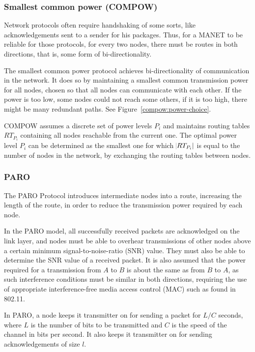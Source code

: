 \subsubsection{Smallest common power (COMPOW)}
Network protocols often require handshaking of some sorts, like acknowledgements
sent to a sender for his packages. Thus, for a MANET to be reliable for those
protocols, for every two nodes, there must be routes in both directions, that
is, some form of bi-directionality.

The smallest common power protocol\cite{narayanaswamy2002power} achieves bi-directionality
of communication in the network.
It does so by maintaining a smallest common transmission power for all nodes,
chosen so that all nodes can communicate with each other. If the power is too
low, some nodes could not reach some others, if it is too high, there might be
many redundant paths. See Figure~\ref{compow:power-choice}.

COMPOW assumes a discrete set of power levels $P_{i}$ and maintains routing
tables ${RT}_{P_{i}}$ containing all nodes reachable from the current one. The
optimal power level $P_{i}$ can be determined as the smallest one for which
$\abs{RT_{P_{i}}}$ is equal to the number of nodes in the network, by
exchanging the routing tables between nodes.


\subsubsection{PARO}
The PARO Protocol\cite{gomez2003paro} introduces intermediate nodes into a
route, increasing the length of the route, in order to reduce the transmission
power required by each node.

In the PARO model, all successfully received packets are acknowledged on the
link layer, and nodes must be able to overhear transmissions of other nodes
above a certain minimum signal-to-noise-ratio (SNR) value. They must also
be able to determine the SNR value of a received packet. It is also assumed
that the power required for a transmission from $A$ to $B$ is about the same
as from $B$ to $A$, as such interference conditions must be similar in both
directions, requiring the use of appropriate interference-free media access
control (MAC) such as found in 802.11.

In PARO, a node keeps it transmitter on for sending a packet for $L/C$ seconds,
where $L$ is the number of bits to be transmitted and $C$ is the speed of the
channel in bits per second.
It also keeps it transmitter on for sending acknowledgements of size $l$.

